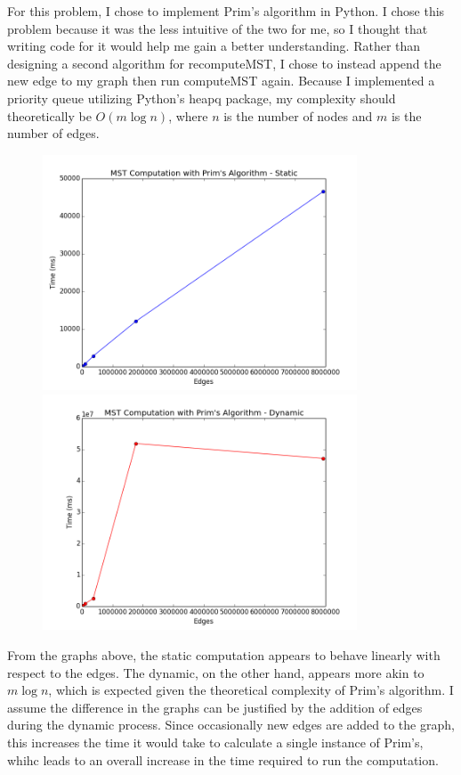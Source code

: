 \documentclass{article}
\begin{document}
For this problem, I chose to implement Prim's algorithm in Python.
I chose this problem because it was the less intuitive of the two for me, so I thought that writing code for it would help me gain a better understanding.
Rather than designing a second algorithm for recomputeMST, I chose to instead append the new edge to my graph then run computeMST again.
Because I implemented a priority queue utilizing Python's heapq package, my complexity should theoretically be $O(m\log{n})$, where $n$ is the number of nodes and $m$ is the number of edges. 
\begin{figure}[H]
\centering
\begin{minipage}[b]{0.4\textwidth}
\includegraphics[height=7cm]{static}	
\end{minipage}
\hspace{0.6in}
\begin{minipage}[b]{0.4\textwidth}
\centering
\includegraphics[height=7cm]{dynamic}	
\end{minipage}
\end{figure}
From the graphs above, the static computation appears to behave linearly with respect to the edges.
The dynamic, on the other hand, appears more akin to $m \log{n}$, which is expected given the theoretical complexity of Prim's algorithm. 
I assume the difference in the graphs can be justified by the addition of edges during the dynamic process. 
Since occasionally new edges are added to the graph, this increases the time it would take to calculate a single instance of Prim's, whihc leads to an overall increase in the time required to run the computation. 
\end{document}
